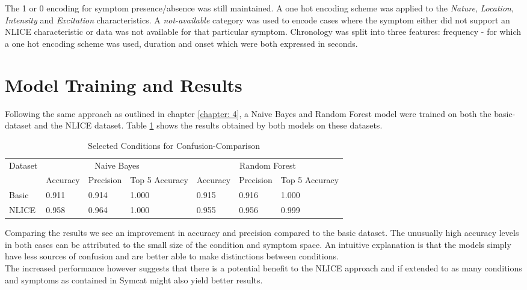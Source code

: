 The 1 or 0 encoding for symptom presence/absence was still maintained. A one hot encoding scheme was applied to the \textit{Nature}, \textit{Location}, \textit{Intensity} and \textit{Excitation} characteristics. A \textit{not-available} category was used to encode cases where the symptom either did not support an NLICE characteristic or data was not available for that particular symptom. Chronology was split into three features: frequency - for which a one hot encoding scheme was used, duration and onset which were both expressed in seconds.

\newpage
\section{Model Training and Results}

Following the same approach as outlined in chapter \ref{chapter: 4}, a Naive Bayes and Random Forest model were trained on both the basic-dataset and the NLICE dataset. Table \ref{table: nlice-baseline-compare} shows the results obtained by both models on these datasets.

\begin{table}[htbp]
	\centering
	\captionsetup{justification=centering}
	\begin{tabular}{|l|l|l|l|l|l|l|}
		\hline

		\multirow{2}{4em}{Dataset}  & \multicolumn{3}{c|}{Naive Bayes} & \multicolumn{3}{c|}{Random Forest}  \\	
		& Accuracy & Precision & Top 5 Accuracy & Accuracy & Precision & Top 5 Accuracy \\ \hline
		Basic   & 0.911        & 0.914         & 1.000    & 0.915        & 0.916         & 1.000    \\
		\hline
		NLICE   & 0.958        & 0.964         & 1.000    & 0.955        & 0.956         & 0.999  \\
		\hline
	\end{tabular}
	\caption[Selected Conditions for Confusion-Comparison]{
		Selected Conditions for Confusion-Comparison \\
	}
	\label{table: nlice-baseline-compare}
\end{table}

Comparing the results we see an improvement in accuracy and precision compared to the basic dataset.  The unusually high accuracy levels in both cases can be attributed to the small size of the condition and symptom space. An intuitive explanation is that the models simply have less sources of confusion and are better able to make distinctions between conditions.\\
The increased performance however suggests that there is a potential benefit to the NLICE approach and if extended to as many conditions and symptoms as contained in Symcat might also yield better results.


